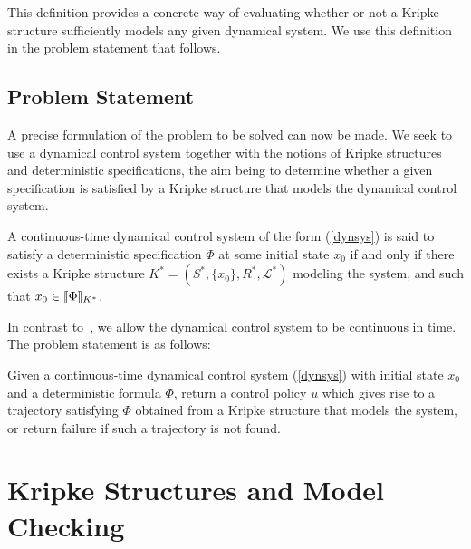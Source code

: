 This definition provides a concrete way of evaluating whether or not a Kripke structure sufficiently models any given dynamical system. We use this definition in the problem statement that follows.


\subsection{Problem Statement}

A precise formulation of the problem to be solved can now be made. We seek to use a dynamical control system together with the notions of Kripke structures and deterministic \mucalc{} specifications, the aim being to determine whether a given specification is satisfied by a Kripke structure that models the dynamical control system.

\begin{defn}
    A continuous-time dynamical control system of the form (\ref{dynsys}) is said to satisfy a deterministic \mucalc{} specification $\Phi$ at some initial state $x_0$ if and only if there exists a Kripke structure 
    $K^* = (S^*,\{x_0\},R^*,\mathcal{L}^*)$ modeling the system, and such that $x_0 \in {\llbracket}{} \Phi {\rrbracket}{}_{K^*}$.
\end{defn}

In contrast to~\cite{Karaman2009}, we allow the dynamical control system to be continuous in time. The problem statement is as follows:

\begin{problem}
    Given a continuous-time dynamical control system (\ref{dynsys}) with initial state $x_0$ and a deterministic \mucalc{} formula $\Phi$, return a control policy $u$ which gives rise to a trajectory satisfying $\Phi$ obtained from a Kripke structure that models the system, or return failure if such a trajectory is not found.
\end{problem}

\section{Kripke Structures and Model Checking}\label{chap:sstpaper:main}


